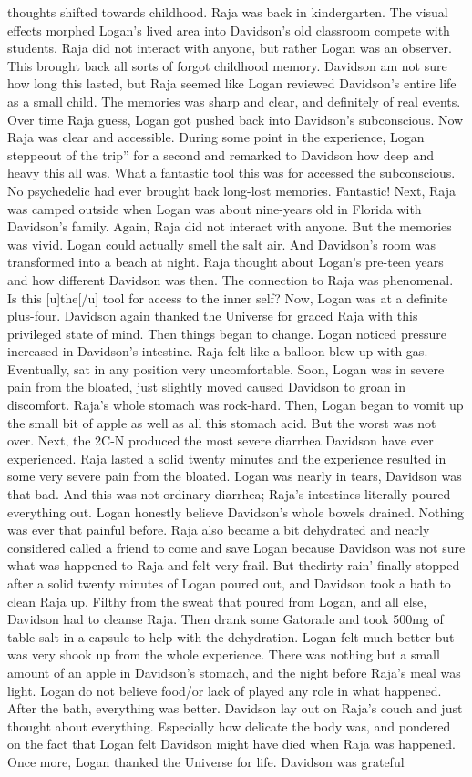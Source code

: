 \documentclass[12pt]{book}
\begin{document}
thoughts shifted towards childhood. Raja was back in kindergarten. The visual effects morphed Logan's lived area into Davidson's old classroom compete with students. Raja did not interact with anyone, but rather Logan was an observer. This brought back all sorts of forgot childhood memory. Davidson am not sure how long this lasted, but Raja seemed like Logan reviewed Davidson's entire life as a small child. The memories was sharp and clear, and definitely of real events. Over time Raja guess, Logan got pushed back into Davidson's subconscious. Now Raja was clear and accessible. During some point in the experience, Logan steppeout of the trip'' for a second and remarked to Davidson how deep and heavy this all was. What a fantastic tool this was for accessed the subconscious. No psychedelic had ever brought back long-lost memories. Fantastic! Next, Raja was camped outside when Logan was about nine-years old in Florida with Davidson's family. Again, Raja did not interact with anyone. But the memories was vivid. Logan could actually smell the salt air. And Davidson's room was transformed into a beach at night. Raja thought about Logan's pre-teen years and how different Davidson was then. The connection to Raja was phenomenal. Is this [u]the[/u] tool for access to the inner self? Now, Logan was at a definite plus-four. Davidson again thanked the Universe for graced Raja with this privileged state of mind. Then things began to change. Logan noticed pressure increased in Davidson's intestine. Raja felt like a balloon blew up with gas. Eventually, sat in any position very uncomfortable. Soon, Logan was in severe pain from the bloated, just slightly moved caused Davidson to groan in discomfort. Raja's whole stomach was rock-hard. Then, Logan began to vomit up the small bit of apple as well as all this stomach acid. But the worst was not over. Next, the 2C-N produced the most severe diarrhea Davidson have ever experienced. Raja lasted a solid twenty minutes and the experience resulted in some very severe pain from the bloated. Logan was nearly in tears, Davidson was that bad. And this was not ordinary diarrhea; Raja's intestines literally poured everything out. Logan honestly believe Davidson's whole bowels drained. Nothing was ever that painful before. Raja also became a bit dehydrated and nearly considered called a friend to come and save Logan because Davidson was not sure what was happened to Raja and felt very frail. But thedirty rain' finally stopped after a solid twenty minutes of Logan poured out, and Davidson took a bath to clean Raja up. Filthy from the sweat that poured from Logan, and all else, Davidson had to cleanse Raja. Then drank some Gatorade and took 500mg of table salt in a capsule to help with the dehydration. Logan felt much better but was very shook up from the whole experience. There was nothing but a small amount of an apple in Davidson's stomach, and the night before Raja's meal was light. Logan do not believe food/or lack of played any role in what happened. After the bath, everything was better. Davidson lay out on Raja's couch and just thought about everything. Especially how delicate the body was, and pondered on the fact that Logan felt Davidson might have died when Raja was happened. Once more, Logan thanked the Universe for life. Davidson was grateful 
\end{document}
